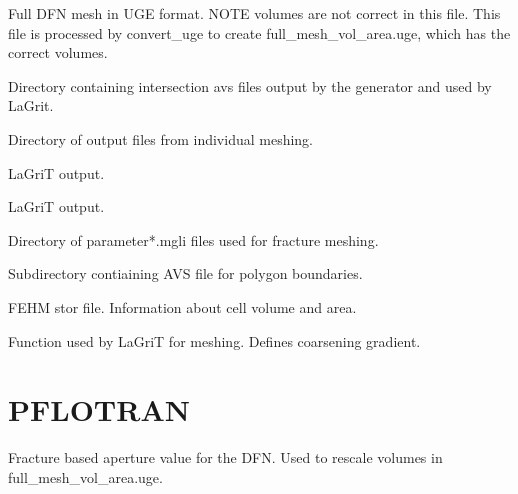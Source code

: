 \documentclass[letterpaper,10pt,english]{sphinxmanual}
\begin{document}

\label{\detokenize{output:full-mesh-uge}}
Full DFN mesh in UGE format. NOTE volumes are not correct in this file. This file is processed by convert\_uge to create full\_mesh\_vol\_area.uge, which has the correct volumes.


\label{\detokenize{output:full-mesh-viz-inp}}

\label{\detokenize{output:intersections}}
Directory containing intersection avs files output by the generator and used by LaGrit.


\label{\detokenize{output:lagrit-logs}}
Directory of output files from individual meshing.


\label{\detokenize{output:logx3dgen}}
LaGriT output.


\label{\detokenize{output:outx3dgen}}
LaGriT output.


\label{\detokenize{output:parameters}}
Directory of parameter*.mgli files used for fracture meshing.


\label{\detokenize{output:polys}}
Subdirectory contiaining AVS file for polygon boundaries.


\label{\detokenize{output:tri-fracture-stor}}
FEHM stor file. Information about cell volume and area.


\label{\detokenize{output:user-function-lgi}}
Function used by LaGriT for meshing. Defines coarsening gradient.


\section{PFLOTRAN}
\label{\detokenize{output:pflotran}}
Fracture based aperture value for the DFN. Used to rescale volumes in full\_mesh\_vol\_area.uge.
\end{document}
